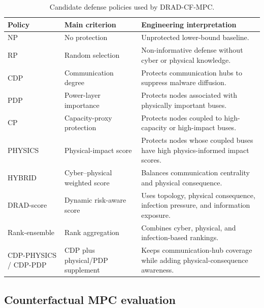 \documentclass[lettersize,journal]{IEEEtran}
\begin{document}
\begin{table}[!tbp]
\centering
\small
\begin{threeparttable}
\caption{Candidate defense policies used by DRAD-CF-MPC.}
\label{tab:candidate_policies}
\begin{tabularx}{0.96\textwidth}{l l X}
\toprule
\rowcolor{TableHeader}
Policy & Main criterion & Engineering interpretation \\
\midrule
\rowcolor{RowWeak}
NP & No protection & Unprotected lower-bound baseline. \\
\rowcolor{RowNeutral}
RP & Random selection & Non-informative defense without cyber or physical knowledge. \\
\rowcolor{RowBaseline}
CDP & Communication degree & Protects communication hubs to suppress malware diffusion. \\
\rowcolor{RowPhysical}
PDP & Power-layer importance & Protects nodes associated with physically important buses. \\
\rowcolor{RowPhysical}
CP & Capacity-proxy protection & Protects nodes coupled to high-capacity or high-impact buses. \\
\rowcolor{RowPhysical}
PHYSICS & Physical-impact score & Protects nodes whose coupled buses have high physics-informed impact scores. \\
\rowcolor{RowScenario}
HYBRID & Cyber--physical weighted score & Balances communication centrality and physical consequence. \\
\rowcolor{RowRisk}
DRAD-score & Dynamic risk-aware score & Uses topology, physical consequence, infection pressure, and information exposure. \\
\rowcolor{RowRisk}
Rank-ensemble & Rank aggregation & Combines cyber, physical, and infection-based rankings. \\
\rowcolor{RowProposed}
CDP-PHYSICS / CDP-PDP & CDP plus physical/PDP supplement & Keeps communication-hub coverage while adding physical-consequence awareness. \\
\bottomrule
\end{tabularx}
\end{threeparttable}
\end{table}

\subsection{Counterfactual MPC evaluation}
\label{subsec:counterfactual_mpc}
\end{document}
